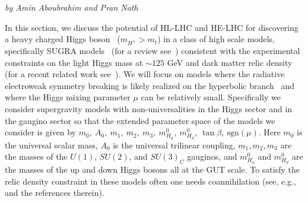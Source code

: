 \begin{center}
 {\it{by Amin Aboubrahim and 
Pran Nath
}}
\end{center}




In this section, we discuss the potential of HL-LHC and HE-LHC for discovering a heavy charged Higgs boson~\cite{Aboubrahim:2018tpf} ($m_{H^{\pm}} > m_t$) in a class of high scale models, specifically SUGRA models~\cite{Chamseddine:1982jx,Nath:1983aw,Hall:1983iz} (for a review see~\cite{Nath:2016qzm}) consistent with the experimental constraints on the light Higgs mass at $\sim 125$ GeV and dark matter relic density (for a recent related work see~\cite{Aboubrahim:2018bil}).  We will focus on models where the
radiative  electroweak symmetry breaking is likely realized on the hyperbolic branch~\cite{Chan:1997bi}
and where the Higgs mixing parameter $\mu$ can be relatively small. Specifically we consider supergravity models with  non-universalities in  the Higgs sector and in the gaugino sector so that 
the extended parameter space of the models we consider is given by $m_0, ~A_0, ~m_1, ~m_2, ~m_3, ~m^0_{H_u}, ~m^0_{H_d}, ~\tan\beta, ~\text{sgn}(\mu)$.
Here $m_0$ is the universal scalar mass, $A_0$ is the universal trilinear coupling, 
$m_1,  m_2, m_3$ are the masses of the $U(1)$, $SU(2)$, and $SU(3)_C$ gauginos, and $m^0_{H_u}$ and $m^0_{H_d}$ are the 
masses of the up and down Higgs bosons all at the GUT scale. To satisfy the relic density constraint in these models often
one needs  coannihilation (see, e.g.,~\cite{Aboubrahim:2017aen,Aboubrahim:2017wjl} and the references therein).

